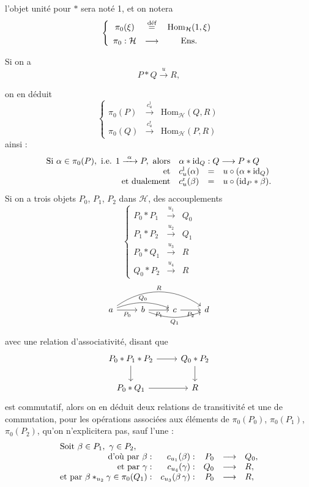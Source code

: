 l'objet unité pour $*$ sera noté 1, et on notera
\[
\left\{
\begin{array}{ccc}
\pi_0(\xi) & \overset{\text{déf}}{=} & \mathrm{Hom}_{\mathcal{H}}(1,\xi) \\[1ex]
\pi_0 : \mathcal{H} & \longrightarrow & \mathrm{Ens}.
\end{array}
\right.
\]

Si on a
\[
P * Q \xrightarrow{\ u\ } R,
\]


on en déduit
\[
\left\{
\begin{array}{lcl}
\pi_0(P) & \xrightarrow{c_u^{\mathrm{l}}} & \mathrm{Hom}_{\mathcal{H}}(Q,R)\\
\pi_0(Q) & \xrightarrow{c_u^{\mathrm{r}}} & \mathrm{Hom}_{\mathcal{H}}(P,R)
\end{array}
\right.
\]
ainsi :
\[
\begin{array}{rlcl}
\text{Si } \alpha\in\pi_0(P),\ \text{i.e. } 1\xrightarrow{\ \alpha\ }P,\ \text{alors} & \multicolumn{3}{l}{\alpha*\mathrm{id}_Q : Q\longrightarrow P*Q}\\
\text{et} & c^{\mathrm{l}}_u(\alpha) & = & u\circ(\alpha*\mathrm{id}_Q)\\
\text{et dualement} & c^{\mathrm{r}}_u(\beta) & = & u\circ(\mathrm{id}_P*\beta).
\end{array}
\]
Si on a trois objets $P_0$, $P_1$, $P_2$ dans $\mathcal{H}$, des accouplements
\[
\left\{
\begin{array}{rcl}
P_0*P_1 & \xrightarrow{u_1} & Q_0\\
P_1*P_2 & \xrightarrow{u_2} & Q_1\\
P_0*Q_1 & \xrightarrow{u_3} & R\\
Q_0*P_2 & \xrightarrow{u_4} & R
\end{array}
\right.
\]
\[
\begin{tikzcd}
a \arrow[r, "P_0"'] \arrow[rr, bend left=20, "Q_0"] \arrow[rrr, bend left=35, "R"] & b \arrow[r, "P_1"'] \arrow[rr, bend right=20, "Q_1"'] & c \arrow[r, "P_2"'] & d
\end{tikzcd}
\]

avec une relation d'associativité, disant que
\[
\begin{tikzcd}
P_0*P_1*P_2 \arrow[r] \arrow[d] & Q_0*P_2 \arrow[d]\\
P_0*Q_1 \arrow[r] & R
\end{tikzcd}
\]
est commutatif, alors on en déduit deux relations de transitivité et une de commutation, pour les opérations associées aux éléments de $\pi_0(P_0)$, $\pi_0(P_1)$, $\pi_0(P_2)$, qu'on n'explicitera pas, sauf l'une :
\[
\begin{array}{rrrcl}
\multicolumn{5}{l}{\text{Soit } \beta\in P_1,\ \gamma\in P_2,}\\
\text{d'où par } \beta : & c_{u_1}(\beta) : & P_0 & \longrightarrow & Q_0,\\
\text{et par } \gamma : & c_{u_4}(\gamma) : & Q_0 & \longrightarrow & R,\\
\text{et par } \beta *_{u_2}\gamma\in\pi_0(Q_1) : & c_{u_3}(\beta\,\gamma) : & P_0 & \longrightarrow & R,
\end{array}
\]

